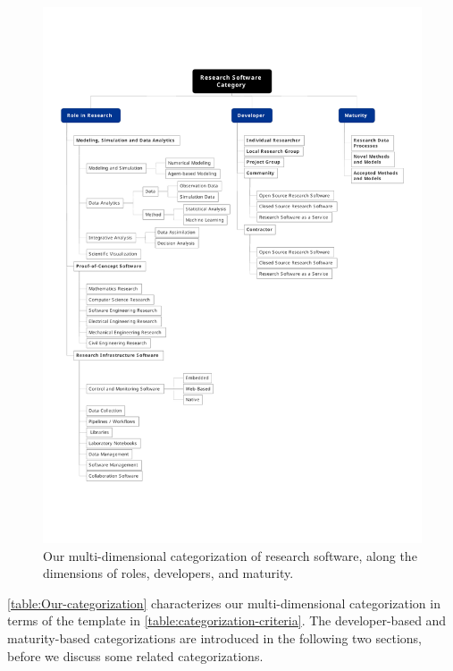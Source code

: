 \documentclass{IEEEcsmag}
\begin{document}
\begin{figure}[p]
	\includegraphics[width=\textwidth]{figures/ResearchSoftwareCategory.pdf}
	\caption{Our multi-dimensional categorization of research software, along the dimensions of roles, developers, and maturity.}
	\label{fig:SoftwareCategorization}
\end{figure}


\autoref{table:Our-categorization} characterizes our multi-dimensional categorization in terms of the template in \autoref{table:categorization-criteria}.
The developer-based and maturity-based categorizations are introduced in the following two sections, before we discuss some related categorizations.
\end{document}
